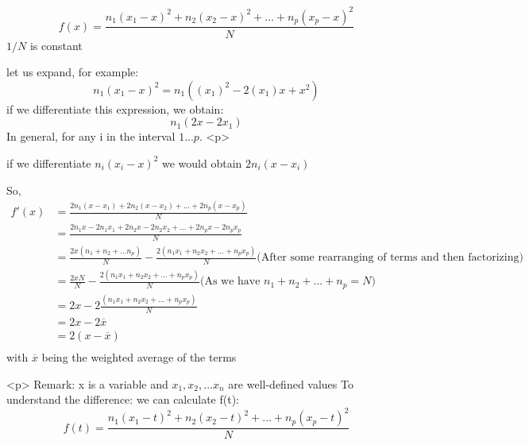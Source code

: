 $$
f(x)=\frac{n_1(x_1-x)^2 +n_2(x_2-x)^2 + ... + n_p (x_p - x)^2}{N}
$$
$1/N$ is constant

let us expand, for example:
$$
n_1(x_1 - x)^2
=n_1((x_1)^2 - 2(x_1)x + x^2)
$$
if we differentiate this expression, we obtain:
$$
n_1(2x - 2x_1)
$$
In general, for any i in the interval $1...p$.
<p>

if we differentiate $n_i(x_i - x)^2$ we would obtain  $2n_i(x - x_i)$

So, 
$$\begin{aligned}
f'(x) &= \frac{2n_1(x-x_1) + 2n_2(x-x_2) + ... + 2n_p(x-x_p)}{N}\\
&= \frac{2n_1x-2n_1x_1 + 2n_2x-2n_2x_2 + ... + 2n_px-2n_px_p}{N}\\
&= \frac{2x(n_1+n_2+...n_p)}{N} -\frac{2(n_1 x_1+n_2 x_2+...+n_p x_p)}{N}\text{(After some rearranging of terms and then factorizing)}\\
 &= \frac{2xN}{N} -\frac{2(n_1 x_1+n_2 x_2+...+n_p x_p)}{N} \text{(As we have $n_1 + n_2 + ... + n_p = N$)}\\
 &= 2x - 2\frac{(n_1 x_1+n_2 x_2+...+n_p x_p)}{N}\\
 &= 2x - 2\overline{x} \\
 &= 2(x - \overline{x})\\
\end{aligned}
$$
with $\overline{x}$ being the weighted average of the terms

<p>
Remark:
x is a variable and $x_1, x_2, ... x_n$ are well-defined values
To understand the difference:
we can calculate f(t):
$$
f(t)=\frac{n_1(x_1-t)^2 +n_2(x_2-t)^2 + ... + n_p (x_p - t)^2}{N}
$$
